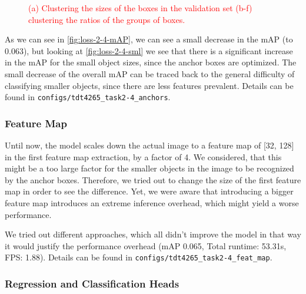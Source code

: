 \documentclass{article}
\begin{document}
\begin{figure}[h!]
    \vspace{-0.15cm}
    \vspace{-0.15cm}
    \caption{\textcolor{red}{(a)  Clustering the sizes of the boxes in the validation set (b-f) clustering the ratios of the groups of boxes.}}
    \label{fig:clustering}
\end{figure}

As we can see in \ref{fig:loss-2-4-mAP}, we can see a small decrease in the mAP (to 0.063), but looking at \ref{fig:loss-2-4-sml} we see that there is a significant increase in the mAP for the small object sizes, since the anchor boxes are optimized. The small decrease of the overall mAP can be traced back to the general difficulty of classifying smaller objects, since there are less features prevalent. Details can be found in \texttt{configs/tdt4265\_task2-4\_anchors}.

\subsubsection*{Feature Map}

Until now, the model scales down the actual image to a feature map of [32, 128] in the first feature map extraction, by a factor of 4. We considered, that this might be a too large factor for the smaller objects in the image to be recognized by the anchor boxes. Therefore, we tried out to change the size of the first feature map in order to see the difference. Yet, we were aware that introducing a bigger feature map introduces an extreme inference overhead, which might yield a worse performance.

We tried out different approaches, which all didn't improve the model in that way it would justify the performance overhead (mAP 0.065, Total runtime: 53.31s, FPS: 1.88). Details can be found in \texttt{configs/tdt4265\_task2-4\_feat\_map}.

\subsubsection*{Regression and Classification Heads}
\end{document}
